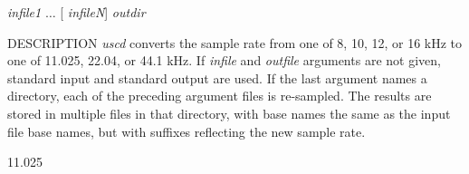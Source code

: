 \begin{synopsis}
\item [uscd] [ --s $S$ $S$] [ +{\em type} ] [ {\em infile} ] [ {\em outfile} ]
\item [uscd] [ --s $S$ $S$] [ +{\em type} ] {\em infile1} $\dots$ [ {\em infileN}] {\em outdir} 
\end{synopsis}

\begin{qsection}{DESCRIPTION}
{\em uscd} converts the sample rate from one of 8, 10, 12, or 16 kHz 
to one of 11.025, 22.04, or 44.1 kHz.
If {\em infile} and {\em outfile} arguments are not given, 
standard input and standard output are used.
If the last argument names a directory, 
each of the preceding argument files is re-sampled. 
The results are stored in multiple files in that directory, 
with base names the same as the input file base names, 
but with suffixes reflecting the new sample rate.
\end{qsection}

\begin{options}
		{11.025}
\end{options}

